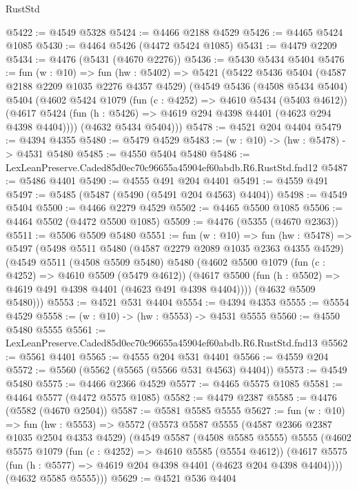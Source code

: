 \begin{lexlean}{RustStd}
\begin{coremodule}
@5422 := @4549 @5328
@5424 := @4466 @2188 @4529
@5426 := @4465 @5424 @1085
@5430 := @4464 @5426 (@4472 @5424 @1085)
@5431 := @4479 @2209
@5434 := @4476 (@5431 (@4670 @2276))
@5436 := @5430 @5434 @5404
@5476 := fun (w : @10) =>
  fun (hw : @5402) =>
  @5421
    (@5422
      @5436
      @5404
      (@4587 @2188 @2209 @1035 @2276 @4357 @4529)
      (@4549
        @5436
        (@4508 @5434 @5404)
        @5404
        (@4602
          @5424
          @1079
          (fun (c : @4252) => @4610 @5434 (@5403 @4612))
          (@4617 @5424 (fun (h : @5426) => @4619 @294 @4398 @4401 (@4623 @294 @4398 @4404))))
        (@4632 @5434 @5404)))
@5478 := @4521 @204 @4404
@5479 := @4394 @4355
@5480 := @5479 @4529
@5483 := (w : @10) -> (hw : @5478) -> @4531 @5480
@5485 := @4550 @5404 @5480
@5486 := LexLeanPreserve.Caded85d0ec70c96655a45904ef60abdb.R6.RustStd.fnd12
@5487 := @5486 @4401
@5490 := @4555 @491 @204 @4401
@5491 := @4559 @491
@5497 := @5485 (@5487 (@5490 (@5491 @204 @4563) @4404))
@5498 := @4549 @5404
@5500 := @4466 @2279 @4529
@5502 := @4465 @5500 @1085
@5506 := @4464 @5502 (@4472 @5500 @1085)
@5509 := @4476 (@5355 (@4670 @2363))
@5511 := @5506 @5509 @5480
@5551 := fun (w : @10) =>
  fun (hw : @5478) =>
  @5497
    (@5498
      @5511
      @5480
      (@4587 @2279 @2089 @1035 @2363 @4355 @4529)
      (@4549
        @5511
        (@4508 @5509 @5480)
        @5480
        (@4602
          @5500
          @1079
          (fun (c : @4252) => @4610 @5509 (@5479 @4612))
          (@4617 @5500 (fun (h : @5502) => @4619 @491 @4398 @4401 (@4623 @491 @4398 @4404))))
        (@4632 @5509 @5480)))
@5553 := @4521 @531 @4404
@5554 := @4394 @4353
@5555 := @5554 @4529
@5558 := (w : @10) -> (hw : @5553) -> @4531 @5555
@5560 := @4550 @5480 @5555
@5561 := LexLeanPreserve.Caded85d0ec70c96655a45904ef60abdb.R6.RustStd.fnd13
@5562 := @5561 @4401
@5565 := @4555 @204 @531 @4401
@5566 := @4559 @204
@5572 := @5560 (@5562 (@5565 (@5566 @531 @4563) @4404))
@5573 := @4549 @5480
@5575 := @4466 @2366 @4529
@5577 := @4465 @5575 @1085
@5581 := @4464 @5577 (@4472 @5575 @1085)
@5582 := @4479 @2387
@5585 := @4476 (@5582 (@4670 @2504))
@5587 := @5581 @5585 @5555
@5627 := fun (w : @10) =>
  fun (hw : @5553) =>
  @5572
    (@5573
      @5587
      @5555
      (@4587 @2366 @2387 @1035 @2504 @4353 @4529)
      (@4549
        @5587
        (@4508 @5585 @5555)
        @5555
        (@4602
          @5575
          @1079
          (fun (c : @4252) => @4610 @5585 (@5554 @4612))
          (@4617 @5575 (fun (h : @5577) => @4619 @204 @4398 @4401 (@4623 @204 @4398 @4404))))
        (@4632 @5585 @5555)))
@5629 := @4521 @536 @4404

\end{coremodule}
\end{lexlean}
